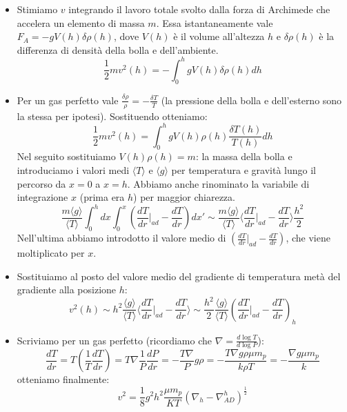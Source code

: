 \documentclass[11pt,a4paper]{article}
\begin{document}
\begin{itemize}
\item Stimiamo $v$ integrando il lavoro totale svolto dalla forza di Archimede che accelera un elemento di massa $m$. Essa istantaneamente vale $F_{A} = - g V(h) \delta \rho(h)$, dove $V(h)$ è il volume all'altezza $h$ e $\delta \rho (h)$ è la differenza di densità della bolla e dell'ambiente.
\begin{equation}
\frac{1}{2} m v^2(h) = - \int _ {0}^{h} g V (h) \delta \rho(h) dh
\end{equation}

\item Per un gas perfetto vale $\frac{\delta \rho}{\rho} = - \frac{\delta T}{T}$ (la pressione della bolla e dell'esterno sono la stessa per ipotesi). Sostituendo otteniamo:
\begin{equation}
\frac{1}{2} m v^2 (h) = \int_{0}^{h} g V(h) \rho(h) \frac{\delta T(h)}{T(h)} dh
\end{equation}
Nel seguito sostituiamo $ V(h) \rho(h) = m$: la massa della bolla e introduciamo i valori medi $\langle T \rangle$ e $\langle g \rangle$ per temperatura e gravità lungo il percorso da $x = 0$ a $x = h$. Abbiamo anche rinominato la variabile di integrazione $x$ (prima era $h$) per maggior chiarezza.
\begin{equation}
\frac{m \langle g \rangle}{\langle T \rangle} \int_{0}^{h} dx \int_{0}^{x} \left( \frac{dT}{dr} \Big | _ {ad} - \frac{dT}{dr} \right) dx' \sim \frac{m \langle g \rangle}{\langle T \rangle} \Big \langle \frac{dT}{dr} \Big | _ {ad} - \frac{dT}{dr} \Big \rangle \frac{h^2}{2}
\end{equation}
Nell'ultima abbiamo introdotto il valore medio di $\left( \frac{dT}{dr} \Big | _ {ad} - \frac{dT}{dr} \right)$, che viene moltiplicato per $x$.

\item Sostituiamo al posto del valore medio del gradiente di temperatura metà del gradiente alla posizione $h$:
\begin{equation}
v^2 (h) \sim h^2 \frac{\langle g \rangle}{\langle T \rangle} \Big \langle \frac{dT}{dr} \Big | _ {ad} - \frac{dT}{dr} \Big \rangle \sim \frac{h^2}{2} \frac{\langle g \rangle}{\langle T \rangle} \left( \frac{dT}{dr} \Big | _ {ad} - \frac{dT}{dr} \right)_{h}
\end{equation}

\item Scriviamo per un gas perfetto (ricordiamo che $\nabla = \frac{d \log T}{d \log P}$):
\begin{equation}
\frac{dT}{dr} = T \left( \frac{1}{T} \frac{dT}{dr} \right) = T \nabla \frac{1}{P} \frac{dP}{dr} = -\frac{T \nabla}{P} g \rho = - \frac{T \nabla g \rho \mu m_p}{k \rho T} = -\frac{\nabla g \mu m_p}{k}
\end{equation}
otteniamo finalmente:
\begin{equation}
v^2 = \frac{1}{8} g^2 h^2 \frac{\mu m_p}{K T} \left( \nabla_{h} - \nabla_{AD}^{h} \right) ^ {\frac{1}{2}}
\end{equation}


\end{itemize}
\end{document}
